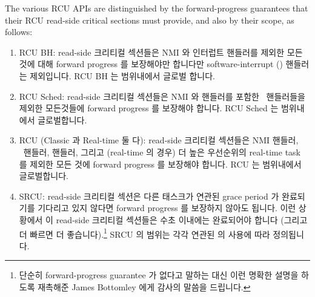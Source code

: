 The various RCU APIs are distinguished by the forward-progress
guarantees that their RCU read-side critical sections must provide,
and also by their scope, as follows:
\fi

\begin{enumerate}
\item	RCU BH: read-side 크리티컬 섹션들은 NMI 와 인터럽트 핸들러를 제외한
	모든 것에 대해 forward progress 를 보장해야만 합니다만
	software-interrupt () 핸들러는 제외입니다.
	RCU BH 는 범위내에서 글로벌 합니다.
\item	RCU Sched: read-side 크리티컬 섹션들은 NMI 와  핸들러를
	포함한 \IRQ\ 핸들러들을 제외한 모든것들에 forward progress 를 보장해야
	합니다.
	RCU Sched 는 범위내에서 글로벌합니다.
\item	RCU (Classic 과 Real-time 둘 다): read-side 크리티컬 섹션들은 NMI
	핸들러, \IRQ\ 핸들러,  핸들러, 그리고 (real-time 의 경우) 더
	높은 우선순위의 real-time task 를 제외한 모든 것에 forward progress 를
	보장해야 합니다.
	RCU 는 범위내에서 글로벌합니다.
\item	SRCU: read-side 크리티컬 섹션은 다른 태스크가 연관된 grace period 가
	완료되기를 기다리고 있지 않다면 forward progress 를 보장하지 않아도
	됩니다.
	이런 상황에서 이 read-side 크리티컬 섹션들은 수초 이내에는 완료되어야
	합니다 (그리고 더 빠르면 더 좋습니다).\footnote{
		단순히 forward-progress guarantee 가 없다고 말하는 대신 이런
		명확한 설명을 하도록 재촉해준 James Bottomley 에게 감사의
		말씀을 드립니다.}
	SRCU 의 범위는 각각 연관된  의 사용에 따라 정의됩니다.

\end{enumerate}

